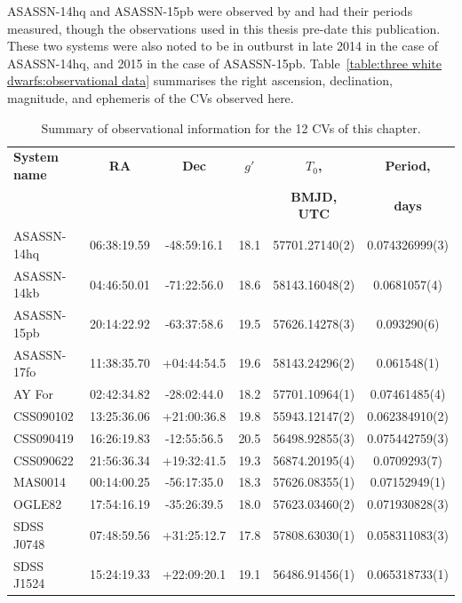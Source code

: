 ASASSN-14hq and ASASSN-15pb were observed by \citet{paterson2019} and had their periods measured, though the observations used in this thesis pre-date this publication.
These two systems were also noted to be in outburst in late 2014 in the case of ASASSN-14hq, and 2015 in the case of ASASSN-15pb.
Table~\ref{table:three white dwarfs:observational data} summarises the right ascension, declination, magnitude, and ephemeris of the CVs observed here.

\newpage
    \begin{table}
        \centering
        \caption{Summary of observational information for the 12 CVs of this chapter. }
        \begin{tabular}{lccccc}
            \hline
            {\bf System name} & {\bf RA} & {\bf Dec} & {\bf $g'$}      & {\bf $T_0$,}    & {\bf Period,} \\
                              &          &           &                 & {\bf BMJD, UTC} & {\bf days}      \\
            \hline
            \hline
            ASASSN-14hq     & 06:38:19.59 & -48:59:16.1 & 18.1 & 57701.27140(2) & 0.074326999(3) \\
            ASASSN-14kb     & 04:46:50.01 & -71:22:56.0 & 18.6 & 58143.16048(2) & 0.0681057(4) \\
            ASASSN-15pb     & 20:14:22.92 & -63:37:58.6 & 19.5 & 57626.14278(3) & 0.093290(6) \\
            ASASSN-17fo     & 11:38:35.70 & +04:44:54.5 & 19.6 & 58143.24296(2) & 0.061548(1) \\
            AY For          & 02:42:34.82 & -28:02:44.0 & 18.2 & 57701.10964(1) & 0.07461485(4) \\
            CSS090102       & 13:25:36.06 & +21:00:36.8 & 19.8 & 55943.12147(2) & 0.062384910(2) \\
            CSS090419       & 16:26:19.83 & -12:55:56.5 & 20.5 & 56498.92855(3) & 0.075442759(3) \\
            CSS090622       & 21:56:36.34 & +19:32:41.5 & 19.3 & 56874.20195(4) & 0.0709293(7) \\
            MAS0014         & 00:14:00.25 & -56:17:35.0 & 18.3 & 57626.08355(1) & 0.07152949(1) \\
            OGLE82          & 17:54:16.19 & -35:26:39.5 & 18.0 & 57623.03460(2) & 0.071930828(3) \\
            SDSS J0748      & 07:48:59.56 & +31:25:12.7 & 17.8 & 57808.63030(1) & 0.058311083(3) \\
            SDSS J1524      & 15:24:19.33 & +22:09:20.1 & 19.1 & 56486.91456(1) & 0.065318733(1) \\
            \hline
        \end{tabular}
    \end{table}
